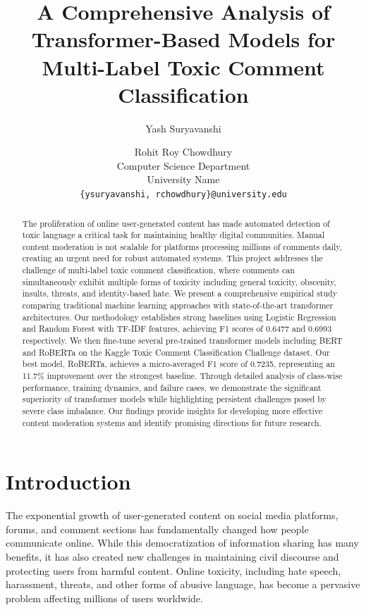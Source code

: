 \documentclass[11pt]{article}
\title{A Comprehensive Analysis of Transformer-Based Models for Multi-Label Toxic Comment Classification}
\author{Yash Suryavanshi \and Rohit Roy Chowdhury \\
  Computer Science Department \\
  University Name \\
  \texttt{\{ysuryavanshi, rchowdhury\}@university.edu}}
\begin{document}
\maketitle

\begin{abstract}
The proliferation of online user-generated content has made automated detection of toxic language a critical task for maintaining healthy digital communities. Manual content moderation is not scalable for platforms processing millions of comments daily, creating an urgent need for robust automated systems. This project addresses the challenge of multi-label toxic comment classification, where comments can simultaneously exhibit multiple forms of toxicity including general toxicity, obscenity, insults, threats, and identity-based hate. We present a comprehensive empirical study comparing traditional machine learning approaches with state-of-the-art transformer architectures. Our methodology establishes strong baselines using Logistic Regression and Random Forest with TF-IDF features, achieving F1 scores of 0.6477 and 0.6993 respectively. We then fine-tune several pre-trained transformer models including BERT and RoBERTa on the Kaggle Toxic Comment Classification Challenge dataset. Our best model, RoBERTa, achieves a micro-averaged F1 score of 0.7235, representing an 11.7\% improvement over the strongest baseline. Through detailed analysis of class-wise performance, training dynamics, and failure cases, we demonstrate the significant superiority of transformer models while highlighting persistent challenges posed by severe class imbalance. Our findings provide insights for developing more effective content moderation systems and identify promising directions for future research.
\end{abstract}

\section{Introduction}

The exponential growth of user-generated content on social media platforms, forums, and comment sections has fundamentally changed how people communicate online. While this democratization of information sharing has many benefits, it has also created new challenges in maintaining civil discourse and protecting users from harmful content. Online toxicity, including hate speech, harassment, threats, and other forms of abusive language, has become a pervasive problem affecting millions of users worldwide.
\end{document}
